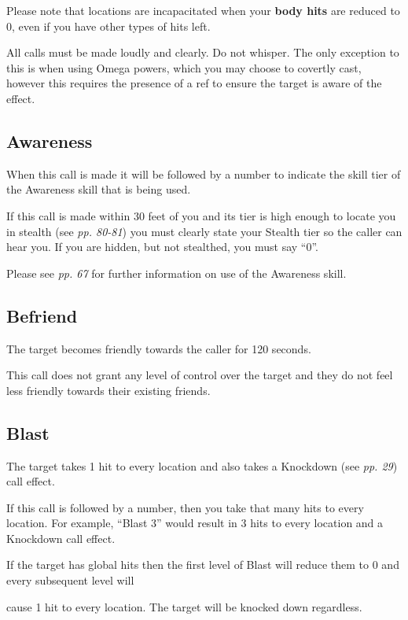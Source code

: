 Please note that locations are incapacitated when your \textbf{body hits} are reduced to 0, even if you have other types of hits left.

All calls must be made loudly and clearly. Do not whisper. The only exception to this is when using Omega powers, which you may choose to covertly cast, however this requires the presence of a ref to ensure the target is aware of the effect.

\subsection{Awareness}

When this call is made it will be followed by a number to indicate the skill tier of the Awareness skill that is being used.

If this call is made within 30 feet of you and its tier is high enough to locate you in stealth (see \textit{pp. 80-81}) you must clearly state your Stealth tier so the caller can hear you. If you are hidden, but not stealthed, you must say ``0''.

Please see \textit{pp. 67} for further information on use of the Awareness skill.

\subsection{Befriend}

The target becomes friendly towards the caller for 120 seconds.

This call does not grant any level of control over the target and they do not feel less friendly towards their existing friends.

\subsection{Blast}

The target takes 1 hit to every location and also takes a Knockdown (see \textit{pp. 29}) call effect.

If this call is followed by a number, then you take that many hits to every location. For example, ``Blast 3'' would result in 3 hits to every location and a Knockdown call effect.

If the target has global hits then the first level of Blast will reduce them to 0 and every subsequent level will

cause 1 hit to every location. The target will be knocked down regardless.

